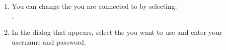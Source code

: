 \begin{enumerate}
\item You can change the \gddb{}  you are connected to by selecting:\\
.
\item In the dialog that appears, select the \gddb{} you want to use and enter your username and password.
\end{enumerate}
